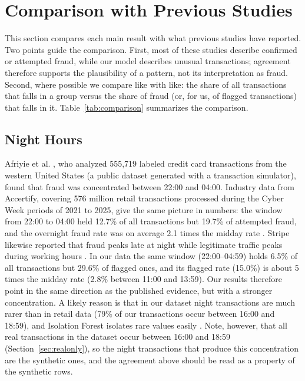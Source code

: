 \documentclass[journal]{IEEEtran}
\begin{document}
\section{Comparison with Previous Studies}
\label{sec:comparison}

This section compares each main result with what previous studies have reported. Two points guide the comparison. First, most of these studies describe confirmed or attempted fraud, while our model describes unusual transactions; agreement therefore supports the plausibility of a pattern, not its interpretation as fraud. Second, where possible we compare like with like: the share of all transactions that falls in a group versus the share of fraud (or, for us, of flagged transactions) that falls in it. Table~\ref{tab:comparison} summarizes the comparison.

\subsection{Night Hours}

Afriyie et al. \cite{afriyie2023supervised}, who analyzed 555,719 labeled credit card transactions from the western United States (a public dataset generated with a transaction simulator), found that fraud was concentrated between 22:00 and 04:00. Industry data from Accertify, covering 576 million retail transactions processed during the Cyber Week periods of 2021 to 2025, give the same picture in numbers: the window from 22:00 to 04:00 held 12.7\% of all transactions but 19.7\% of attempted fraud, and the overnight fraud rate was on average 2.1 times the midday rate \cite{accertify2026cyber}. Stripe likewise reported that fraud peaks late at night while legitimate traffic peaks during working hours \cite{woodward2017stripe}. In our data the same window (22:00--04:59) holds 6.5\% of all transactions but 29.6\% of flagged ones, and its flagged rate (15.0\%) is about 5 times the midday rate (2.8\% between 11:00 and 13:59). Our results therefore point in the same direction as the published evidence, but with a stronger concentration. A likely reason is that in our dataset night transactions are much rarer than in retail data (79\% of our transactions occur between 16:00 and 18:59), and Isolation Forest isolates rare values easily \cite{liu2008isolation}. Note, however, that all real transactions in the dataset occur between 16:00 and 18:59 (Section~\ref{sec:realonly}), so the night transactions that produce this concentration are the synthetic ones, and the agreement above should be read as a property of the synthetic rows.
\end{document}
